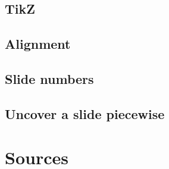 \documentclass[10pt,xcolor=x11names,compress,fleqn]{beamer}
\begin{document}
  \subsection{TikZ}
  
  
  \subsection{Alignment}
  
  
  \subsection{Slide numbers}   
  
  
  \subsection{Uncover a slide piecewise}
  
  
  \section{Sources}   
  
		
\end{document}
